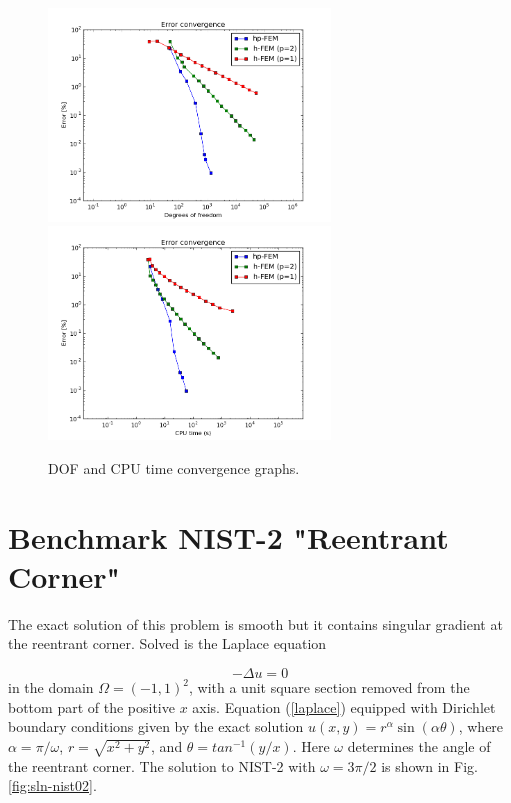 \documentclass[12pt]{elsarticle}
\begin{document}
\begin{figure}[H]
\centering
\vspace{-3mm}
\hspace{-50mm}
\includegraphics[width=7.5cm]{nist/nist-1/conv_dof_aniso.png}\ \
\hspace{-8mm}
\includegraphics[width=7.5cm]{nist/nist-1/conv_cpu_aniso.png}
\hspace{-50mm}
\vspace{-2mm}
\caption{DOF and CPU time convergence graphs.}
\vspace{-1mm}
\label{fig:nist-1-conv}
\end{figure}


\section{Benchmark NIST-2 "Reentrant Corner"}
\label{sec:bench-2}

The exact solution of this problem is smooth but it contains
singular gradient at the reentrant corner.
Solved is the Laplace equation

\begin{equation} \label{laplace}
-\Delta u = 0
\end{equation}
in the domain $\Omega = (-1, 1)^2$, with a unit square
section removed from the bottom part of the positive $x$ axis.
Equation (\ref{laplace}) equipped with Dirichlet
boundary conditions given by the exact solution
$u(x, y) = r^{\alpha}\sin(\alpha \theta)$,
where $\alpha = \pi / \omega$, $r = \sqrt{x^2+y^2}$,
and $\theta = tan^{-1}(y/x)$. Here $\omega $ determines
the angle of the reentrant corner.
The solution to NIST-2 with $\omega = 3 \pi / 2$
is shown in Fig. \ref{fig:sln-nist02}.
\end{document}
